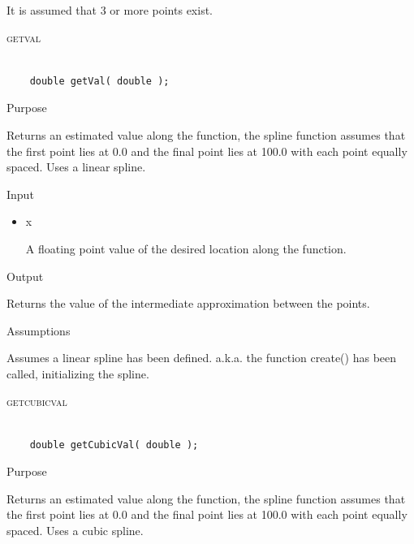 \documentclass[pdftex, 11pt]{article}
\begin{document}
\begin{description}
\begin{description}
				It is assumed that 3 or more points exist.

		\end{description}


	\item{\textsc{getval}}

		\begin{lstlisting}

	double getVal( double );
		\end{lstlisting}

		\begin{description}
			\item{Purpose}

				Returns an estimated value along the function, the spline function assumes
				that the first point lies at 0.0 and the final point lies at 100.0 with each
				point equally spaced.  Uses a linear spline.

			\item{Input}

				\begin{itemize}

					\item{x}

						A floating point value of the desired location along the function.

				\end{itemize}

			\item{Output}

				Returns the value of the intermediate approximation between the points.

			\item{Assumptions}

				Assumes a linear spline has been defined. a.k.a. the function create()
				has been called, initializing the spline.

		\end{description}


	\item{\textsc{getcubicval}}

		\begin{lstlisting}

	double getCubicVal( double );
		\end{lstlisting}

		\begin{description}
			\item{Purpose}

				Returns an estimated value along the function, the spline function assumes
				that the first point lies at 0.0 and the final point lies at 100.0 with each
				point equally spaced.  Uses a cubic spline.


\end{description}
\end{description}
\end{document}
